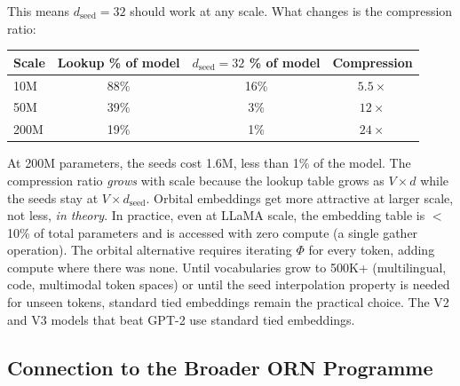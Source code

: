 \documentclass[11pt, a4paper]{article}
\theoremstyle{remark}
\begin{document}
This means $d_{\text{seed}} = 32$ should work at any scale.
What changes is the compression ratio:

\begin{center}\small
\begin{tabular}{@{}lccc@{}}
\toprule
\textbf{Scale} & \textbf{Lookup \% of model} & \textbf{$d_{\text{seed}}{=}32$ \% of model} & \textbf{Compression} \\
\midrule
10M  & 88\% & 16\% & $5.5\times$ \\
50M  & 39\% & 3\%  & $12\times$  \\
200M & 19\% & 1\%  & $24\times$  \\
\bottomrule
\end{tabular}
\end{center}

At 200M parameters, the seeds cost 1.6M, less than 1\% of the model.
The compression ratio \emph{grows} with scale because the lookup table grows as $V \times d$ while the seeds stay at $V \times d_{\text{seed}}$.
Orbital embeddings get more attractive at larger scale, not less, \emph{in theory}.
In practice, even at LLaMA scale, the embedding table is $<$10\% of total parameters and is accessed with zero compute (a single gather operation).
The orbital alternative requires iterating $\Phi$ for every token, adding compute where there was none.
Until vocabularies grow to 500K+ (multilingual, code, multimodal token spaces) or until the seed interpolation property is needed for unseen tokens, standard tied embeddings remain the practical choice.
The V2 and V3 models that beat GPT-2 use standard tied embeddings.

\subsection{Connection to the Broader ORN Programme}
\end{document}
